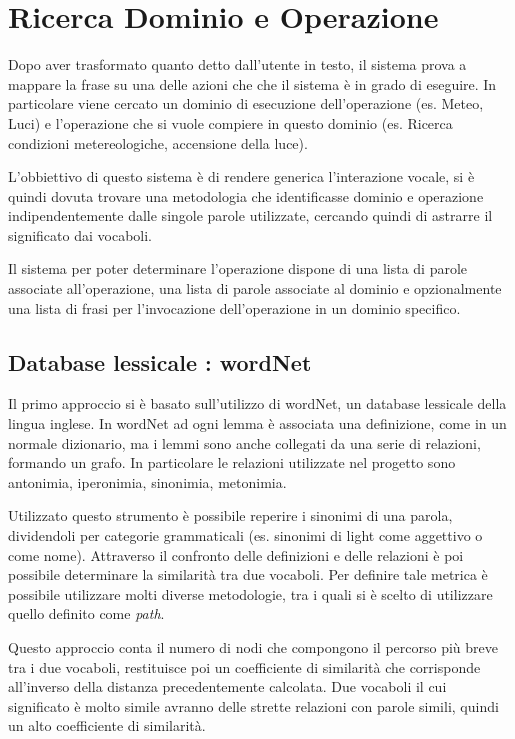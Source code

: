 \documentclass[twoside]{supsistudent}
\begin{document}
\chapter{Ricerca Dominio e Operazione}
Dopo aver trasformato quanto detto dall'utente in testo, il sistema prova a mappare la frase su una delle azioni che che il sistema è in grado di eseguire.
In particolare viene cercato un dominio di esecuzione dell'operazione (es. Meteo, Luci) e l'operazione che si vuole compiere in questo dominio (es. Ricerca condizioni metereologiche, accensione della luce).


L'obbiettivo di questo sistema è di rendere generica l'interazione vocale, si è quindi dovuta trovare una metodologia che identificasse dominio e operazione indipendentemente dalle singole parole utilizzate, cercando quindi di astrarre il significato dai vocaboli.

 Il sistema per poter determinare l'operazione dispone di una lista di parole associate all'operazione, una lista di parole associate al dominio e opzionalmente una lista di frasi per l'invocazione dell'operazione in un dominio specifico.

\section{Database lessicale : wordNet}
Il primo approccio si è basato sull'utilizzo di wordNet, un database lessicale della lingua inglese.
In wordNet ad ogni lemma è associata una definizione, come in un normale dizionario, ma i lemmi sono anche collegati da una serie di relazioni, formando un grafo. In particolare le relazioni utilizzate nel progetto sono antonimia, iperonimia, sinonimia, metonimia.\cite{wordNet}

Utilizzato questo strumento è possibile reperire i sinonimi di una parola, dividendoli per categorie grammaticali (es. sinonimi di light come aggettivo o come nome).
Attraverso il confronto delle definizioni e delle relazioni è poi possibile determinare la similarità tra due vocaboli. Per definire tale metrica è possibile utilizzare molti diverse metodologie, tra i quali si è scelto di utilizzare quello definito come \textit{path}. \cite{wordNetWordSimilarity}

Questo approccio conta il numero di nodi che compongono il percorso più breve tra i due vocaboli, restituisce poi un coefficiente di similarità che corrisponde all'inverso della distanza precedentemente calcolata. Due vocaboli il cui significato è molto simile avranno delle strette relazioni con parole simili, quindi un alto coefficiente di similarità.\cite{wordNetPathSimilarity}
\end{document}
